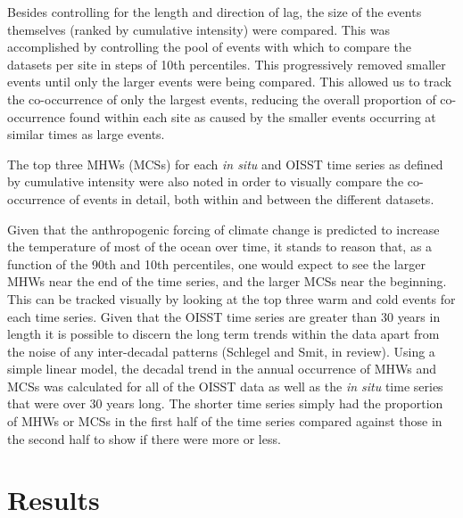 \documentclass[a4paper,10pt,review]{elsarticle}
\begin{document}
Besides controlling for the length and direction of lag, the size of the events themselves (ranked by cumulative intensity) were compared. This was accomplished by controlling the pool of events with which to compare the datasets per site in steps of 10th percentiles. This progressively removed smaller events until only the larger events were being compared. This allowed us to track the co-occurrence of only the largest events, reducing the overall proportion of co-occurrence found within each site as caused by the smaller events occurring at similar times as large events.

The top three MHWs (MCSs) for each \emph{in situ} and OISST time series as defined by cumulative intensity were also noted in order to visually compare the co-occurrence of events in detail, both within and between the different datasets.

Given that the anthropogenic forcing of climate change is predicted to increase the temperature of most of the ocean over time, it stands to reason that, as a function of the 90th and 10th percentiles, one would expect to see the larger MHWs near the end of the time series, and the larger MCSs near the beginning. This can be tracked visually by looking at the top three warm and cold events for each time series. Given that the OISST time series are greater than 30 years in length it is possible to discern the long term trends within the data apart from the noise of any inter-decadal patterns (Schlegel and Smit, in review). Using a simple linear model, the decadal trend in the annual occurrence of MHWs and MCSs was calculated for all of the OISST data as well as the \emph{in situ} time series that were over 30 years long. The shorter time series simply had the proportion of MHWs or MCSs in the first half of the time series compared against those in the second half to show if there were more or less.

\section{Results}
\end{document}
